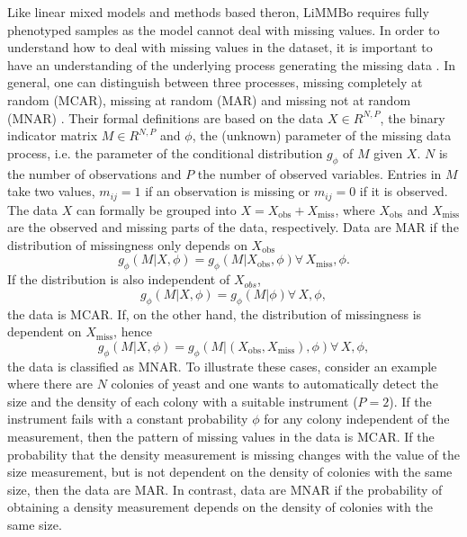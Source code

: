Like linear mixed models and methods based theron, LiMMBo requires fully phenotyped samples as the model cannot deal with missing values. In order to understand how to deal with missing values in the dataset, it is important to have an understanding of the underlying process generating the missing data \citep{Rubin1976}. In general, one can distinguish between three processes, missing completely at random (MCAR), missing at random (MAR) and missing not at random (MNAR) \citep{Little2002}. Their formal definitions are based on the data \(X  \in R^{N,P}\),  the binary indicator matrix \(M  \in R^{N,P}\)  and \(\phi\), the (unknown) parameter of the missing data process, i.e. the parameter of the conditional distribution \(g_\phi\) of \(M\) given \(X\). \(N\) is the number of observations and \(P\) the number of observed variables. Entries in \(M\) take two values,  \(m_{ij} = 1 \) if an observation is missing or  \(m_{ij} = 0\) if it is observed. The data \(X\) can formally be grouped into \(X=X_\text{obs} + X_\text{miss}\), where \(X_\text{obs}\) and  \(X_\text{miss}\) are the observed and missing parts of the data, respectively. Data are MAR if the distribution of missingness only depends on \(X_{\text{obs}}\)
\begin{equation}
g_\phi(M | X, \phi) =  g_\phi(M | X_{\text{obs}}, \phi)  \forall \, X_\text{miss}, \phi.
\end{equation}
If the distribution is also independent of \(X_{obs}\), 
\begin{equation}
g_\phi(M | X, \phi) =  g_\phi(M | \phi) \forall \, X, \phi,
\end{equation}
the data is MCAR. If, on the other hand, the distribution of missingness is dependent on \(X_{\text{miss}}\), hence
\begin{equation}
g_\phi(M | X, \phi) =  g_\phi(M | (X_{\text{obs}}, X_{\text{miss}}),\phi) \forall \, X, \phi,
\end{equation}
the data is classified as MNAR. To illustrate these cases, consider an example where there are \(N\) colonies of yeast and one wants to automatically detect the size and the density of each colony with a suitable instrument (\(P=2\)). If the instrument fails with a constant probability \(\phi\) for any colony independent of the measurement, then the pattern of missing values in the data is MCAR. If the probability that the density measurement is missing changes with the value of the size measurement, but is not dependent on the density of colonies with the same size, then the data are MAR. In contrast, data are MNAR if the probability of obtaining a density measurement depends on the density of colonies with the same size. 

